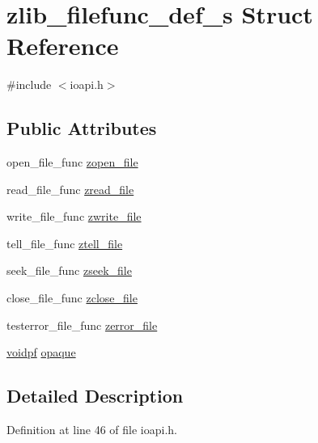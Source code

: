 \hypertarget{structzlib__filefunc__def__s}{\section{zlib\-\_\-filefunc\-\_\-def\-\_\-s Struct Reference}
\label{structzlib__filefunc__def__s}
}


{\ttfamily \#include $<$ioapi.\-h$>$}

\subsection*{Public Attributes}
\begin{DoxyCompactItemize}
\item 
open\-\_\-file\-\_\-func \hyperlink{structzlib__filefunc__def__s_a49b78a559140e495b94af4d9dfe5c4e9}{zopen\-\_\-file}
\item 
read\-\_\-file\-\_\-func \hyperlink{structzlib__filefunc__def__s_ab14f748de7516525e5d2b78c47aca92e}{zread\-\_\-file}
\item 
write\-\_\-file\-\_\-func \hyperlink{structzlib__filefunc__def__s_a710b490fec793486ef5bedd9f2e1136d}{zwrite\-\_\-file}
\item 
tell\-\_\-file\-\_\-func \hyperlink{structzlib__filefunc__def__s_ac8b933601443cdd83f8cc02004c77d0d}{ztell\-\_\-file}
\item 
seek\-\_\-file\-\_\-func \hyperlink{structzlib__filefunc__def__s_a4747bdf97a3f44fe4b958114c11e1dcf}{zseek\-\_\-file}
\item 
close\-\_\-file\-\_\-func \hyperlink{structzlib__filefunc__def__s_ac46ac7ec0540dce117dab3f210d26763}{zclose\-\_\-file}
\item 
testerror\-\_\-file\-\_\-func \hyperlink{structzlib__filefunc__def__s_a61182b5b3ff83fb509b57ab4d2d9816d}{zerror\-\_\-file}
\item 
\hyperlink{zconf_8h_aa0944432a046192e6602e13ec126acaa}{voidpf} \hyperlink{structzlib__filefunc__def__s_a494b6d634b61bdc7fc7caed8e4fbe3f4}{opaque}
\end{DoxyCompactItemize}


\subsection{Detailed Description}


Definition at line 46 of file ioapi.\-h.



